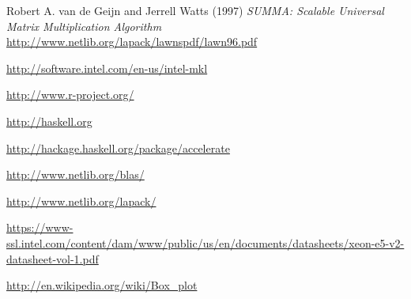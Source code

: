 \documentclass{article}
\begin{document}
\begin{thebibliography}{9}

  Robert A. van de Geijn and Jerrell Watts (1997)
  \emph{SUMMA: Scalable Universal Matrix Multiplication Algorithm}
  \url{http://www.netlib.org/lapack/lawnspdf/lawn96.pdf}
 
  \url{http://software.intel.com/en-us/intel-mkl}

  \url{http://www.r-project.org/}

  \url{http://haskell.org}

  \url{http://hackage.haskell.org/package/accelerate}

  \url{http://www.netlib.org/blas/}

  \url{http://www.netlib.org/lapack/}

  \url{https://www-ssl.intel.com/content/dam/www/public/us/en/documents/datasheets/xeon-e5-v2-datasheet-vol-1.pdf}

  \url{http://en.wikipedia.org/wiki/Box_plot}

\end{thebibliography}
\end{document}
